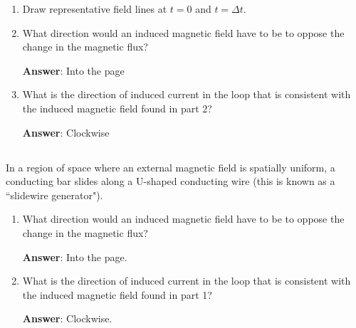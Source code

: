 \documentclass{article}
\begin{document}
\begin{enumerate}

  \item Draw representative field lines at $t=0$ and $t=\Delta t$.

        \ifsolutions

        \else

        
        \fi

  \item What direction would an induced magnetic field have to be to oppose the change in the magnetic flux?

        \ifsolutions
        {\bf Answer}: Into the page
        \else

        \fi

  \item What is the direction of induced current in the loop that is consistent with the induced magnetic field found in part 2?

        \ifsolutions
        {\bf Answer}: Clockwise
        \else
        \fi

\end{enumerate}

\subsection{}

In a region of space where an external magnetic field is spatially uniform, a conducting bar slides along a U-shaped conducting wire (this is known as a ``slidewire generator").



\begin{enumerate}

  \item What direction would an induced magnetic field have to be to oppose the change in the magnetic flux?

        \ifsolutions
        {\bf Answer}: Into the page.
        \else

        \fi

  \item What is the direction of induced current in the loop that is consistent with the induced magnetic field found in part 1?

        \ifsolutions
        {\bf Answer}: Clockwise.
        \else

        \fi

\end{enumerate}
\end{document}
